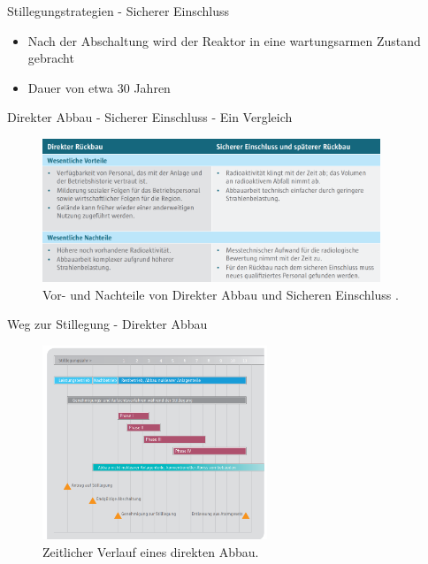 \begin{frame}{Stillegungstrategien - Sicherer Einschluss}
  \begin{itemize}
    \setlength\itemsep{1.2em}
    \item{ Nach der Abschaltung wird der Reaktor in eine wartungsarmen Zustand gebracht}
    \item{ Dauer von etwa $30$ Jahren}
  \end{itemize}
\end{frame}



\begin{frame}{ Direkter Abbau - Sicherer Einschluss - Ein Vergleich}
  \begin{figure}
     \centering
     \includegraphics[width=0.9\textwidth]{./bilder/vor_nachteile_direkter_einschluss.PNG}
     \caption{ Vor- und Nachteile von Direkter Abbau und Sicheren Einschluss \cite{stilllegung_grs}. }
     \label{ fig: karte_abschaltungen }
   \end{figure}
\end{frame}



\begin{frame}{ Weg zur Stillegung - Direkter Abbau }
  \begin{figure}
     \centering
     \includegraphics[width=0.6\textwidth]{./bilder/stillegungs_zeit_2_kernfragen.PNG}
     \caption{ Zeitlicher Verlauf eines direkten Abbau\cite{stilllegung_grs}. }
     \label{ fig: stillegung }
   \end{figure}
\end{frame}



